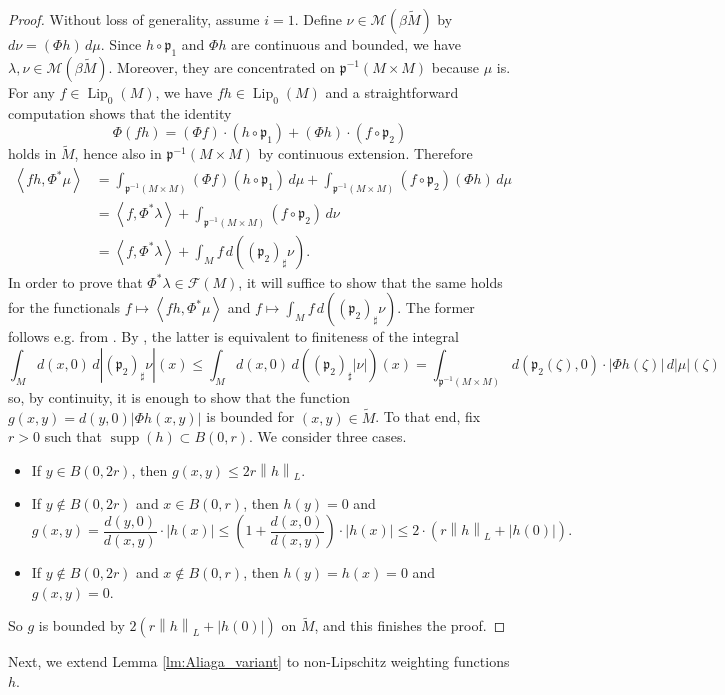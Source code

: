 \documentclass[a4paper,10pt]{amsart}
\DeclareMathOperator{\supp}{supp}                           %
\DeclareMathOperator{\Lip}{Lip}                             %
\newcommand{\abs}[1]{\left|{#1}\right|}                     %
\newcommand{\pare}[1]{\left({#1}\right)}                    %
\newcommand{\norm}[1]{\left\|{#1}\right\|}                  %
\newcommand{\dual}[1]{{#1}^\ast}                            %
\newcommand{\duality}[1]{\left<{#1}\right>}                 %
\newcommand{\lipfree}[1]{\mathcal{F}({#1})}                 %
\newcommand{\lipnorm}[1]{\norm{#1}_L}                       %
\newcommand{\meas}[1]{\mathcal{M}({#1})}                    %
\newcommand{\wt}[1]{\widetilde{#1}}                         %
\newcommand{\bwt}[1]{\beta\wt{#1}}                          %
\newcommand{\pp}{\mathfrak{p}}                              %
\renewcommand{\leq}{\leqslant}
\theoremstyle{plain}
\theoremstyle{definition}
\theoremstyle{remark}
\begin{document}
\begin{proof}
Without loss of generality, assume $i=1$. Define $\nu\in\meas{\bwt{M}}$ by $d\nu=(\Phi h)\,d\mu$. Since $h\circ\pp_1$ and $\Phi h$ are continuous and bounded, we have $\lambda,\nu\in\meas{\bwt{M}}$. Moreover, they are concentrated on $\pp^{-1}(M \times M)$ because $\mu$ is.
For any $f\in\Lip_0(M)$, we have $fh\in\Lip_0(M)$ and a straightforward computation shows that the identity
$$
\Phi (fh) = (\Phi f)\cdot (h\circ\pp_1) + (\Phi h)\cdot (f\circ\pp_2)
$$
holds in $\wt{M}$, hence also in $\pp^{-1}(M\times M)$ by continuous extension. Therefore
\begin{align*}
\duality{fh,\dual{\Phi}\mu} &= \int_{\pp^{-1}(M \times M)}(\Phi f)(h\circ\pp_1)\,d\mu + \int_{\pp^{-1}(M \times M)}(f\circ\pp_2)(\Phi h)\,d\mu \\
&= \duality{f,\dual{\Phi}\lambda} + \int_{\pp^{-1}(M\times M)}(f\circ\pp_2)\,d\nu \\
&= \duality{f,\dual{\Phi}\lambda} + \int_M f\,d((\pp_2)_\sharp\nu) .
\end{align*}
In order to prove that $\Phi^*\lambda\in\lipfree{M}$, it will suffice to show that the same holds for the functionals $f\mapsto\duality{fh,\dual{\Phi}\mu}$ and $f \mapsto \int_M f\,d((\pp_2)_\sharp\nu)$. The former follows e.g. from \cite[Lemma 2.3]{APPP_2020}. By \cite[Proposition 4.4]{AP_measures}, the latter is equivalent to finiteness of the integral
$$
\int_M d(x,0)\,d\abs{(\pp_2)_\sharp\nu}(x) \leq \int_M d(x,0)\,d((\pp_2)_\sharp\abs{\nu})(x) = \int_{\pp^{-1}(M\times M)} d(\pp_2(\zeta),0)\cdot\abs{\Phi h(\zeta)}\,d\abs{\mu}(\zeta)
$$
so, by continuity, it is enough to show that the function $g(x,y)=d(y,0)\abs{\Phi h(x,y)}$ is bounded for $(x,y)\in\wt{M}$. To that end, fix $r>0$ such that $\supp(h)\subset B(0,r)$. We consider three cases.
\begin{itemize}
\item If $y\in B(0,2r)$, then $g(x,y)\leq 2r\lipnorm{h}$.
\item If $y\notin B(0,2r)$ and $x\in B(0,r)$, then $h(y)=0$ and
$$
g(x,y) = \frac{d(y,0)}{d(x,y)}\cdot |h(x)| \leq \pare{1+\frac{d(x,0)}{d(x,y)}}\cdot |h(x)| \leq 2\cdot (r\lipnorm{h}+|h(0)|) .
$$
\item If $y\notin B(0,2r)$ and $x\notin B(0,r)$, then $h(y)=h(x)=0$ and $g(x,y)=0$.
\end{itemize}
So $g$ is bounded by $2(r\lipnorm{h}+|h(0)|)$ on $\wt{M}$, and this finishes the proof.
\end{proof}


Next, we extend Lemma \ref{lm:Aliaga_variant} to non-Lipschitz weighting functions $h$.
\end{document}
